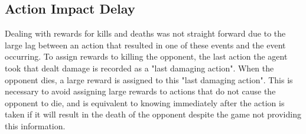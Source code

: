 \subsection{Action Impact Delay}

Dealing with rewards for kills and deaths was not straight forward due to the large lag between an action that resulted in one of these events and the event occurring. To assign rewards to killing the opponent, the last action the agent took that dealt damage is recorded as a "last damaging action". When the opponent dies, a large reward is assigned to this "last damaging action". This is necessary to avoid assigning large rewards to actions that do not cause the opponent to die, and is equivalent to knowing immediately after the action is taken if it will result in the death of the opponent despite the game not providing this information.





